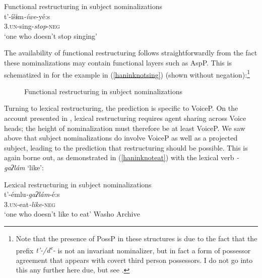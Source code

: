 \documentclass[output=paper]{langscibook}
\begin{document}
\ea Functional restructuring in subject nominalizations\\
{\gll t'-íšɨm\textit{-íwe}-yé:s\\
{\scshape 3.un}-sing-\textit{stop}-{\scshape neg}\\
\glt `one who doesn't stop singing'} \label{haninknotsing}
\z

The availability of functional restructuring follows straightforwardly from the fact these nominalizations may contain functional layers such as AspP. This is schematized in  for the example in (\ref{haninknotsing}) (shown without negation):\footnote{Note that the presence of PossP in these structures is due to the fact that the prefix {\itshape t'-/d\textsuperscript{e}-} is not an invariant nominalizer, but in fact a form of possessor agreement that appears with covert third person possessors. I do not go into this any further here due, but see \citet{hanink2020}.}

\begin{figure}
\caption{Functional restructuring in subject nominalizations\label{haninksubjectfunctional}}
 \end{figure}
 
Turning to lexical restructuring, the prediction is specific to VoiceP. On the account presented in , lexical restructuring requires agent sharing across Voice heads; the height of nominalization must therefore be at least VoiceP. We saw above that subject nominalizations do involve VoiceP as well as a projected subject, leading to the prediction that restructuring should be possible. This is again borne out, as demonstrated in (\ref{haninknoteat}) with the lexical verb {\itshape -gaʔlám} `like': 

\ea Lexical restructuring in subject nominalizations\\
\gll t'-émlu\textit{-gaʔlám}-é:s\\
{\scshape 3.un}-eat\textit{-like}-{\scshape neg}\\
\glt `one who doesn't like to eat' \label{haninknoteat}\hfill Washo Archive
\z
\end{document}
